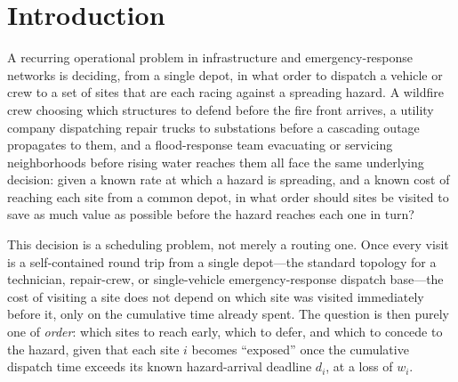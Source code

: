 \documentclass[pdflatex,sn-mathphys-ay]{sn-jnl}
\theoremstyle{thmstyleone}
\theoremstyle{thmstyletwo}
\theoremstyle{thmstylethree}
\begin{document}

\maketitle

\section{Introduction}\label{sec:intro}

A recurring operational problem in infrastructure and emergency-response
networks is deciding, from a single depot, in what order to dispatch a
vehicle or crew to a set of sites that are each racing against a
spreading hazard. A wildfire crew choosing which structures to defend
before the fire front arrives, a utility company dispatching repair
trucks to substations before a cascading outage propagates to them, and
a flood-response team evacuating or servicing neighborhoods before
rising water reaches them all face the same underlying decision: given
a known rate at which a hazard is spreading, and a known cost of
reaching each site from a common depot, in what order should sites be
visited to save as much value as possible before the hazard reaches
each one in turn?

This decision is a scheduling problem, not merely a routing one. Once
every visit is a self-contained round trip from a single depot---the
standard topology for a technician, repair-crew, or single-vehicle
emergency-response dispatch base---the cost of visiting a site does not
depend on which site was visited immediately before it, only on the
cumulative time already spent. The question is then purely one of
\emph{order}: which sites to reach early, which to defer, and which to
concede to the hazard, given that each site $i$ becomes ``exposed''
once the cumulative dispatch time exceeds its known hazard-arrival
deadline $d_i$, at a loss of $w_i$.
\end{document}
